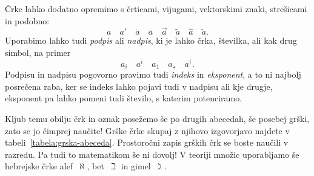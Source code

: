 Črke lahko dodatno opremimo s črticami, vijugami, vektorskimi znaki, strešicami in podobno:
%
\begin{equation*}
 a \quad
 a' \quad
 \dot{a} \quad
 \bar{a} \quad
 \vec{a} \quad
 \tilde{a} \quad
 \hat{a} \quad
 \check{a}.
\end{equation*}
%
Uporabimo lahko tudi \emph{podpis} ali
\emph{nadpis}, ki je lahko črka, številka, ali kak drug simbol, na primer
%
\begin{equation*}
  a_i \quad
  a^i \quad
  a_1 \quad
  a_{\star} \quad
  a^{\dagger}.
\end{equation*}
%
Podpisu in nadpisu pogovorno pravimo tudi \emph{indeks} in \emph{eksponent}, a to ni
najbolj posrečena raba, ker se indeks lahko pojavi tudi v nadpisu ali kje drugje,
eksponent pa lahko pomeni tudi število, s katerim potenciramo.

Kljub temu obilju črk in oznak posežemo še po drugih abecedah, še posebej grški, zato se
jo čimprej naučite! Grške črke skupaj z njihovo izgovorjavo najdete v
tabeli~\ref{tabela:grska-abeceda}. Prostoročni zapis grških črk se boste naučili v
razredu.
%
Pa tudi to matematikom še ni dovolj! V teoriji množic uporabljamo še hebrejske črke
alef~$\aleph$, bet~$\beth$ in gimel~$\gimel$.

